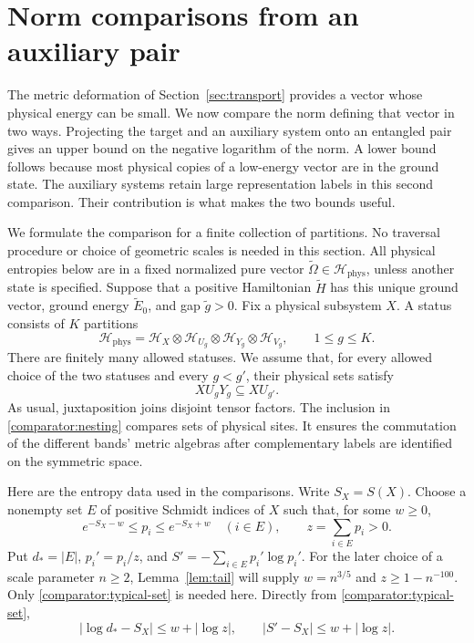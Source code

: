\section{Norm comparisons from an auxiliary pair}
\label{sec:comparators}

The metric deformation of Section~\ref{sec:transport} provides a vector
whose physical energy can be small.  We now compare the norm defining that
vector in two ways.  Projecting the target and an auxiliary system onto an
entangled pair gives an upper bound on the negative logarithm of the norm.
A lower bound follows because most physical copies of a low-energy vector
are in the ground state.  The auxiliary systems retain large representation
labels in this second comparison.  Their contribution is what makes the two
bounds useful.

We formulate the comparison for a finite collection of partitions.  No
traversal procedure or choice of geometric scales is needed in this section.
All physical entropies below are in a fixed normalized pure vector
$\widetilde\Omega\in\mathcal H_{\mathrm{phys}}$, unless another state is
specified.  Suppose that a positive Hamiltonian $\widetilde H$ has this
unique ground vector, ground energy $\widetilde E_0$, and gap
$\widetilde g>0$.  Fix a physical subsystem $X$.  A status consists of $K$
partitions
\[
 \mathcal H_{\mathrm{phys}}=\mathcal H_X\otimes
 \mathcal H_{U_g}\otimes\mathcal H_{Y_g}\otimes\mathcal H_{V_g},
 \qquad 1\le g\le K.
\]
There are finitely many allowed statuses.  We assume that, for every allowed
choice of the two statuses and every $g<g'$, their physical sets satisfy
\begin{equation}
 XU_gY_g\subseteq XU_{g'}.
 \label{comparator:nesting}
\end{equation}
As usual, juxtaposition joins disjoint tensor factors.  The inclusion in
\eqref{comparator:nesting} compares sets of physical sites.  It ensures the
commutation of the different bands' metric algebras after complementary
labels are identified on the symmetric space.

Here are the entropy data used in the comparisons.  Write
$S_X=S(X)$.  Choose a nonempty set $E$ of positive Schmidt indices of $X$
such that, for some $w\ge0$,
\begin{equation}
 e^{-S_X-w}\le p_i\le e^{-S_X+w}\quad(i\in E),
 \qquad z=\sum_{i\in E}p_i>0.
 \label{comparator:typical-set}
\end{equation}
Put $d_*=|E|$, $p_i'=p_i/z$, and $S'= -\sum_{i\in E}p_i'\log p_i'$.
For the later choice of a scale parameter $n\ge2$,
Lemma~\ref{lem:tail} will supply $w=n^{3/5}$ and $z\ge1-n^{-100}$.
Only \eqref{comparator:typical-set} is needed here.  Directly from
\eqref{comparator:typical-set},
\begin{equation}
 |\log d_*-S_X|\le w+|\log z|,
 \qquad |S'-S_X|\le w+|\log z|.
 \label{comparator:typical-entropies}
\end{equation}

